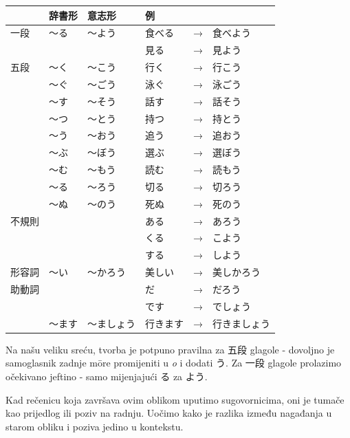 	\begin{table}[h]
		\centering
		\begin{tabular}{llllll}
			\toprule[2pt]
			& 辞書形 & 意志形 & 例 & & \\
			\midrule
			一段 & 〜る & 〜よう & 食べる&→&食べよう \\
			& & & 見る&→&見よう \\
			\midrule
			五段 & 〜く & 〜こう & 行く&→&行こう\\
			& 〜ぐ & 〜ごう & 泳ぐ&→&泳ごう\\
			& 〜す & 〜そう & 話す&→&話そう\\
			& 〜つ & 〜とう & 持つ&→&持とう\\
			& 〜う & 〜おう & 追う&→&追おう\\
			& 〜ぶ & 〜ぼう & 選ぶ&→&選ぼう\\
			& 〜む & 〜もう & 読む&→&読もう\\
			& 〜る & 〜ろう & 切る&→&切ろう\\
			& 〜ぬ & 〜のう & 死ぬ&→&死のう\\
			\midrule
			不規則 & & & ある &→& あろう \\
			& & & くる &→& こよう \\
			& & & する &→& しよう \\
			\midrule
			形容詞 & 〜い & 〜かろう & 美しい&→&美しかろう \\
			\midrule
			助動詞 & & & だ &→& だろう \\
			& & & です &→& でしょう \\
			& 〜ます & 〜ましょう & 行きます&→&行きましょう \\
			\bottomrule[2pt]
		\end{tabular}
	\end{table}

	Na našu veliku sreću, tvorba je potpuno pravilna za 五段 glagole - dovoljno je samoglasnik zadnje m\={o}re promijeniti u \textit{o} i dodati う.
	Za 一段 glagole prolazimo očekivano jeftino - samo mijenjajući る za よう.
	
	\newpage
	
	Kad rečenicu koja završava ovim oblikom uputimo sugovornicima, oni je tumače kao prijedlog ili poziv na radnju. Uočimo kako je razlika između nagađanja u starom obliku i poziva jedino u kontekstu.
	
	\begin{reibun}
	\end{reibun}
	
